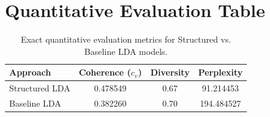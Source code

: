 \documentclass{article}
\begin{document}
\section{Quantitative Evaluation Table}
\label{app:metrics}
\begin{table}[ht]
    \centering
    \begin{tabular}{lccc}
        \hline
        Approach       & Coherence ($c_v$) & Diversity & Perplexity \\
        \hline
        Structured LDA & 0.478549          & 0.67      & 91.214453  \\
        Baseline LDA   & 0.382260          & 0.70      & 194.484527 \\
        \hline
    \end{tabular}
    \caption{Exact quantitative evaluation metrics for Structured vs. Baseline LDA models.}
    \label{tab:metrics-app}
\end{table}
\end{document}
